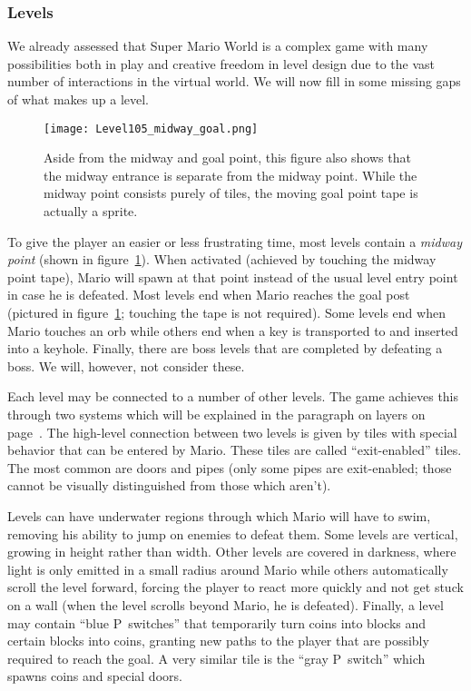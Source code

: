 \subsubsection{Levels}
\label{sec:levels}

We already assessed that Super Mario World is a complex game with many
possibilities both in play and creative freedom in level design due to
the vast number of interactions in the virtual world. We will now fill
in some missing gaps of what makes up a level.

\begin{figure}[t]
  \centering
  \texttt{[image: Level105\_midway\_goal.png]}
  \caption{Aside from the midway and goal point, this figure also
    shows that the midway entrance is separate from the midway point.
    While the midway point consists purely of tiles, the moving goal
    point tape is actually a sprite.}
  \label{fig:midway-goal}
\end{figure}

To give the player an easier or less frustrating time, most levels
contain a \emph{midway point} (shown in figure~\ref{fig:midway-goal}).
When activated (achieved by touching the midway point tape), Mario
will spawn at that point instead of the usual level entry point in
case he is defeated. Most levels end when Mario reaches the goal post
(pictured in figure~\ref{fig:midway-goal}; touching the tape is not
required). Some levels end when Mario touches an orb while others end
when a key is transported to and inserted into a keyhole. Finally,
there are boss levels that are completed by defeating a boss. We will,
however, not consider these.

Each level may be connected to a number of other levels. The game
achieves this through two systems which will be explained in the
paragraph on layers on page~\pageref{par:layers}. The high-level
connection between two levels is given by tiles with special behavior
that can be entered by Mario. These tiles are called ``exit-enabled''
tiles. The most common are doors and pipes (only some pipes are
exit-enabled; those cannot be visually distinguished from those which
aren't).

Levels can have underwater regions through which Mario will have to
swim, removing his ability to jump on enemies to defeat them. Some
levels are vertical, growing in height rather than width. Other levels
are covered in darkness, where light is only emitted in a small radius
around Mario while others automatically scroll the level forward,
forcing the player to react more quickly and not get stuck on a wall
(when the level scrolls beyond Mario, he is defeated). Finally, a
level may contain ``blue P~switches'' that temporarily turn coins into
blocks and certain blocks into coins, granting new paths to the player
that are possibly required to reach the goal. A very similar tile is
the ``gray P~switch'' which spawns coins and special doors.

